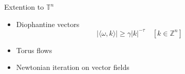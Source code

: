 \documentclass[]{beamer}
\newcommand{\T}{\mathbb{T}}
\begin{document}
\begin{frame}{Extention to $\T^n$}
\pause
\begin{itemize}
    \item Diophantine vectors
    \begin{equation*}
         |\langle \omega, k \rangle | \ge \gamma|k|^{-\tau} \quad [k \in \mathbb{Z}^n]
    \end{equation*} 
\vspace{-.5cm}
\pause
    \item Torus flows 
\pause
    \item Newtonian iteration on vector fields
\end{itemize}

\end{frame}




\end{document}
